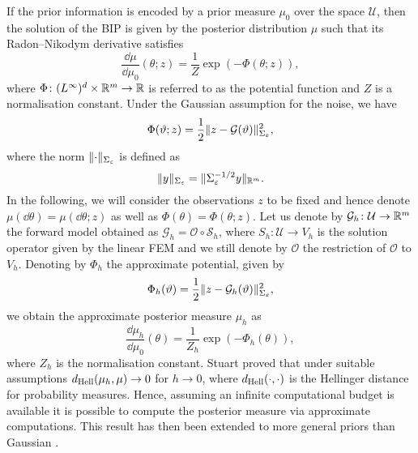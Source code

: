 If the prior information is encoded by a prior measure $\mu_0$ over the space $\mathcal U$, then the solution of the BIP is given by the posterior distribution $\mu$ such that its Radon--Nikodym derivative satisfies
\begin{equation}
	\frac{\dd \mu}{\dd \mu_0}(\theta; z) = \frac{1}{Z}\exp(-\Phi(\theta; z)),
\end{equation}
where $\Phi \colon (L^{\infty})^d \times \mathbb{R}^m \to \mathbb{R}$ is referred to as the potential function and $Z$ is a normalisation constant. Under the Gaussian assumption for the noise, we have
\begin{equation}
	\Phi(\vartheta; z) = \frac{1}{2} \lVert z - \mathcal G(\vartheta)\rVert_{\Sigma_\varepsilon}^2,
\end{equation} 
where the norm $\lVert\cdot\rVert_{\Sigma_\varepsilon}$ is defined as
\begin{equation}
	\lVert y\rVert_{\Sigma_\varepsilon} = \lVert\Sigma_\varepsilon^{-1/2} y\rVert_{\mathbb{R}^m}.
\end{equation}
In the following, we will consider the observations $z$ to be fixed and hence denote $\mu(\dd \theta) = \mu(\dd \theta; z)$ as well as $\Phi(\theta) = \Phi(\theta; z)$. Let us denote by $\mathcal G_h \colon \mathcal U \to \mathbb{R}^m$ the forward model obtained as $\mathcal G_h = \mathcal O \circ \mathcal S_h$, where $S_h \colon \mathcal U  \to V_h$ is the solution operator given by the linear FEM and we still denote by $\mathcal O$ the restriction of $\mathcal O$ to $V_h$. Denoting by $\Phi_h$ the approximate potential, given by
\begin{equation}\label{eq:ApproxPotential}
	\Phi_h(\vartheta) = \frac{1}{2} \lVert z - \mathcal G_h(\vartheta)\rVert_{\Sigma_\varepsilon}^2,
\end{equation} 
we obtain the approximate posterior measure $\mu_h$ as 
\begin{equation}\label{eq:ApproxPosterior}
	\frac{\dd \mu_h}{\dd \mu_0}(\theta) = \frac{1}{Z_h}\exp(-\Phi_h(\theta)),
\end{equation}
where $Z_h$ is the normalisation constant. Stuart proved \cite[Theorem 4.6]{Stu10} that under suitable assumptions $d_{\mathrm{Hell}}(\mu_h, \mu) \to 0$ for $h \to 0$, where $d_{\mathrm{Hell}}(\cdot, \cdot)$ is the Hellinger distance for probability measures. Hence, assuming an infinite computational budget is available it is possible to compute the posterior measure via approximate computations. This result has then been extended to more general priors than Gaussian \cite{DaS16, Sul17}.

